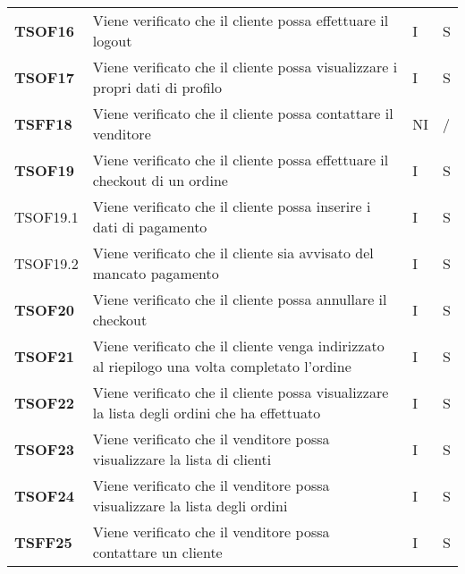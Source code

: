 \begin{center}
\begin{longtable}[!h]{p{60px} p{240px} p{35px} p{35px}}
        \textbf{TSOF16} & Viene verificato che il cliente possa effettuare il logout                                                          & I              & S              \\
        \textbf{TSOF17} & Viene verificato che il cliente possa visualizzare i propri dati di profilo                                         & I              & S              \\
        \textbf{TSFF18} & Viene verificato che il cliente possa contattare il venditore                                                       & NI             & /              \\
        \textbf{TSOF19} & Viene verificato che il cliente possa effettuare il checkout di un ordine                                           & I              & S              \\
        TSOF19.1        & Viene verificato che il cliente possa inserire i dati di pagamento                                                  & I              & S              \\
        TSOF19.2        & Viene verificato che il cliente sia avvisato del mancato pagamento                                         & I              & S              \\
        \textbf{TSOF20} & Viene verificato che il cliente possa annullare il checkout                                                         & I              & S              \\
        \textbf{TSOF21} & Viene verificato che il cliente venga indirizzato al riepilogo una volta completato l'ordine                       & I              & S              \\
        \textbf{TSOF22} & Viene verificato che il cliente possa visualizzare la lista degli ordini che ha effettuato                          & I              & S              \\
        \textbf{TSOF23} & Viene verificato che il venditore possa visualizzare la lista di clienti                                            & I              & S              \\
        \textbf{TSOF24} & Viene verificato che il venditore possa visualizzare la lista degli ordini                                          & I              & S              \\
        \textbf{TSFF25} & Viene verificato che il venditore possa contattare un cliente                                                       & I              & S              \\

\end{longtable}
\end{center}
